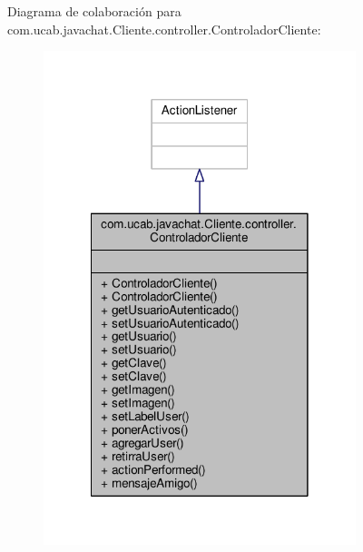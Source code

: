 Diagrama de colaboración para com.\-ucab.\-javachat.\-Cliente.\-controller.\-Controlador\-Cliente\-:
\nopagebreak
\begin{figure}[H]
\begin{center}
\leavevmode
\includegraphics[width=258pt]{de/d44/classcom_1_1ucab_1_1javachat_1_1_cliente_1_1controller_1_1_controlador_cliente__coll__graph}
\end{center}
\end{figure}
